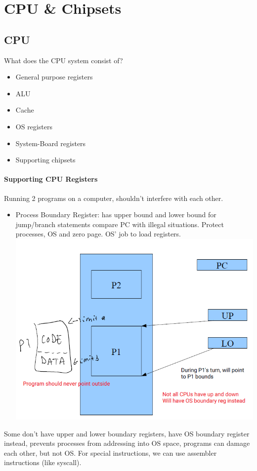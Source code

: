 \documentclass[12 pt]{article}
\begin{document}
\section{CPU \& Chipsets}
\subsection{CPU}
What does the CPU system consist of?
\begin{itemize}
\item General purpose registers
\item ALU
\item Cache
\item OS registers
\item System-Board registers
\item Supporting chipsets
\end{itemize}
\paragraph{Supporting CPU Registers}
Running 2 programs on a computer, shouldn't interfere with each other.
\begin{itemize}
\item Process Boundary Register: has upper bound and lower bound for jump/branch statements compare PC with illegal situations. Protect processes, OS and zero page. OS' job to load registers.
\\ \includegraphics[scale=0.7]{pbd}
\end{itemize}
Some don't have upper and lower boundary registers, have OS boundary register instead, prevents processes from addressing into OS space, programs can damage each other, but not OS. For special instructions, we can use assembler instructions (like syscall).
\end{document}
